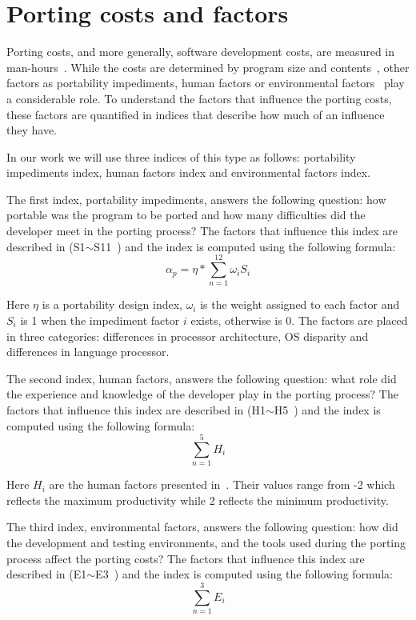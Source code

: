 \section{Porting costs and factors}

Porting costs, and more generally, software development costs, are measured in
man-hours~\cite{tanaka, hakuta}. While the costs are determined by program size
and contents~\cite{hakuta}, other factors as portability impediments, human
factors or environmental factors~\cite{hakuta} play a considerable role. To
understand the factors that influence the porting costs, these factors are
quantified in indices that describe how much of an influence they have.

In our work we will use three indices of this type as follows: portability
impediments index, human factors index and environmental factors index.

The first index, portability impediments, answers the following question: how
portable was the program to be ported and how many difficulties did the
developer meet in the porting process? The factors that influence this index are
described in (S1$\sim$S11~\cite{hakuta}) and the index is computed using the
following formula: \[ \alpha_p = \eta * \sum_{n=1}^{12} \omega_i S_i \]

Here $\eta$ is a portability design index, $\omega_i$ is the weight assigned to
each factor and $S_i$ is 1 when the impediment factor $i$ exists, otherwise is
0. The factors are placed in three categories: differences in processor
architecture, OS disparity and differences in language processor.

The second index, human factors, answers the following question: what role did
the experience and knowledge of the developer play in the porting process? The
factors that influence this index are described in (H1$\sim$H5~\cite{hakuta}) and
the index is computed using the following formula: \[ \sum_{n=1}^{5} H_i \]

Here $H_i$ are the human factors presented in~\cite{hakuta}. Their values range
from -2 which reflects the maximum productivity while 2 reflects the minimum
productivity.

The third index, environmental factors, answers the following question: how did
the development and testing environments, and the tools used during the porting
process affect the porting costs? The factors that influence this index are
described in (E1$\sim$E3~\cite{hakuta}) and the index is computed using the
following formula: \[ \sum_{n=1}^{3} E_i \]

